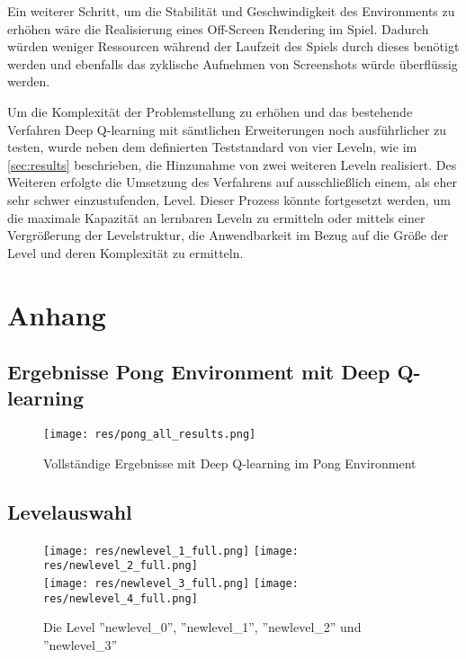 \documentclass[11pt]{scrartcl}
\begin{document}
Ein weiterer Schritt, um die Stabilität und Geschwindigkeit des Environments zu erhöhen wäre die
Realisierung eines Off-Screen Rendering im Spiel. Dadurch würden weniger Ressourcen während der
Laufzeit des Spiels durch dieses benötigt werden und ebenfalls das zyklische Aufnehmen von
Screenshots würde überflüssig werden.

Um die Komplexität der Problemstellung zu erhöhen und das bestehende Verfahren Deep Q-learning mit
sämtlichen Erweiterungen noch ausführlicher zu testen, wurde neben dem definierten Teststandard von
vier Leveln, wie im \autoref{sec:results} beschrieben, die Hinzunahme von zwei weiteren Leveln
realisiert. Des Weiteren erfolgte die Umsetzung des Verfahrens auf ausschließlich einem, als eher
sehr schwer einzustufenden, Level. Dieser Prozess könnte fortgesetzt werden, um die maximale
Kapazität an lernbaren Leveln zu ermitteln oder mittels einer Vergrößerung der Levelstruktur, die
Anwendbarkeit im Bezug auf die Größe der Level und deren Komplexität zu ermitteln.


\newpage
%


\newpage
\listoffigures 
\listoftables 

\newpage
\section{Anhang}

\subsection{Ergebnisse Pong Environment mit Deep Q-learning}
\begin{figure}[htp]
\centering
\texttt{[image: res/pong\_all\_results.png]}
\caption{Vollständige Ergebnisse mit Deep Q-learning im Pong Environment}
\label{fig:pong_all_results}
\end{figure}

\newpage
\subsection{Levelauswahl}
\label{sec:levels}
\begin{figure}[htp]
\centering
\texttt{[image: res/newlevel\_1\_full.png]}
\texttt{[image: res/newlevel\_2\_full.png]}
\newline
\hspace{10pt}\\
\texttt{[image: res/newlevel\_3\_full.png]}
\texttt{[image: res/newlevel\_4\_full.png]}

\caption{
  Die Level ''newlevel\_0'', ''newlevel\_1'',
            ''newlevel\_2'' und ''newlevel\_3''
        }
\end{figure}
\end{document}

